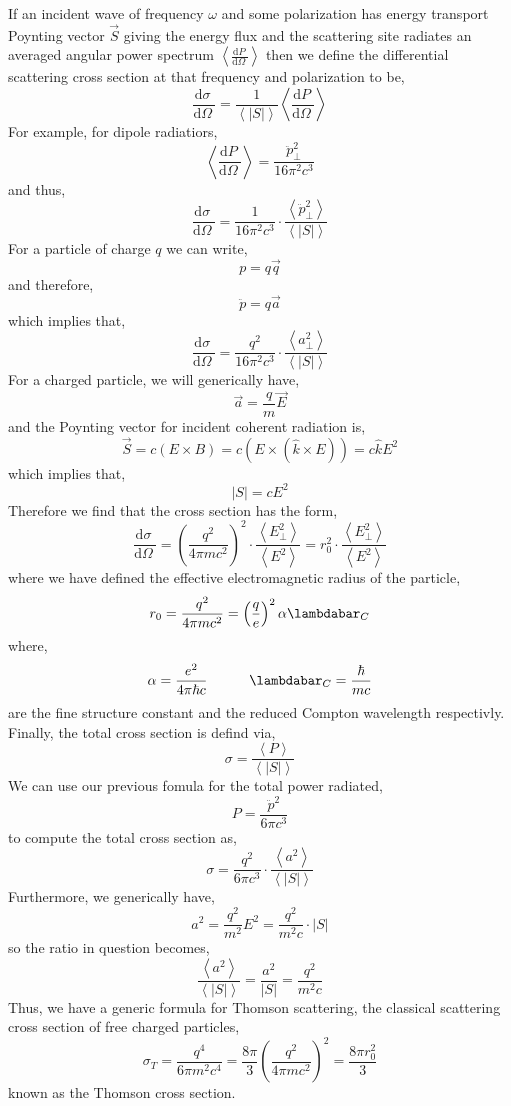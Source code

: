 \documentclass[12pt]{extarticle}
\renewcommand{\d}[1]{ \mathrm{d}#1 \:}
\newcommand{\deriv}[2]{\frac{\d{#1}}{\d{#2}}}
\theoremstyle{definition}
\begin{document}
If an incident wave of frequency $\omega$ and some polarization has energy transport Poynting vector $\vec{S}$ giving the energy flux and the scattering site radiates an averaged angular power spectrum $\left< \deriv{P}{\Omega} \right>$
then we define the differential scattering cross section at that frequency and polarization to be,
\[ \deriv{\sigma}{\Omega} = \frac{1}{\left< |S| \right>} \left< \deriv{P}{\Omega} \right> \]
For example, for dipole radiatiors,
\[ \left< \deriv{P}{\Omega} \right> = \frac{\ddot{p}^2_\perp}{16 \pi^2 c^3} \]
and thus,
\[ \deriv{\sigma}{\Omega} = \frac{1}{16 \pi^2 c^3} \cdot \frac{\left< \ddot{p}^2_\perp \right>}{\left< |S| \right>} \]
For a particle of charge $q$ we can write,
\[ p = q \vec{q} \]
and therefore,
\[ \ddot{p} = q \vec{a} \]
which implies that,
\[ \deriv{\sigma}{\Omega} = \frac{q^2}{16 \pi^2 c^3} \cdot \frac{\left< a^2_\perp \right>}{\left< |S| \right>} \]
For a charged particle, we will generically have,
\[ \vec{a} = \frac{q}{m} \vec{E} \]
and the Poynting vector for incident coherent radiation is,
\[ \vec{S} = c(E \times B) = c (E \times (\hat{k} \times E)) = c \hat{k} E^2 \]
which implies that,
\[ |S| = c E^2 \]
Therefore we find that the cross section has the form,
\[ \deriv{\sigma}{\Omega} = \left( \frac{q^2}{4 \pi m c^2} \right)^2 \cdot \frac{\left< E_\perp^2 \right>}{\left< E^2 \right>} = r_0^2 \cdot \frac{\left< E_\perp^2 \right>}{\left< E^2 \right>} \]
where we have defined the effective electromagnetic radius of the particle,
\[ r_0 = \frac{q^2}{4 \pi m c^2} = \left( \frac{q}{e} \right)^2 \alpha {\lambdabar}_C \]
where, 
\[ \alpha = \frac{e^2}{4\pi \hbar c} \quad \quad \quad \lambdabar_C = \frac{\hbar}{mc} \]
are the fine structure constant and the reduced Compton wavelength respectivly. 
Finally, the total cross section is defind via,
\[ \sigma = \frac{\left< P \right>}{\left< |S| \right>} \]
We can use our previous fomula for the total power radiated,
\[ P = \frac{\ddot{p}^2}{6 \pi c^3} \]
to compute the total cross section as,
\[ \sigma = \frac{q^2}{6 \pi c^3} \cdot \frac{\left< a^2 \right>}{\left< |S| \right>} \]
Furthermore, we generically have,
\[ a^2 = \frac{q^2}{m^2} E^2 = \frac{q^2}{m^2 c} \cdot |S| \]
so the ratio in question becomes,
\[ \frac{\left< a^2 \right>}{\left< |S| \right>} = \frac{a^2}{|S|} = \frac{q^2}{m^2 c} \]
Thus, we have a generic formula for Thomson scattering, the classical scattering cross section of free charged particles,
\[ \sigma_T = \frac{q^4}{6 \pi m^2 c^4} = \frac{8 \pi}{3} \left( \frac{q^2}{4 \pi m c^2} \right)^2 = \frac{8 \pi r_0^2}{3} \]
known as the Thomson cross section. 
\end{document}
